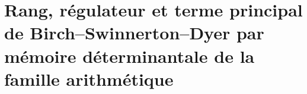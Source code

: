 \HMTFlushCurrentChapter
\chapter{Rang, régulateur et terme principal de Birch--Swinnerton--Dyer par mémoire déterminantale de la famille arithmétique}
\begingroup
\renewcommand{\chapter}[2][]{}%

\endgroup

\HMTFlushCurrentChapter
\chapter{Domaines, opérateurs, naturalité et certificats des réalisations terminales du continu}
\begingroup
\renewcommand{\chapter}[2][]{}%

\endgroup











\HMTFlushCurrentChapter
